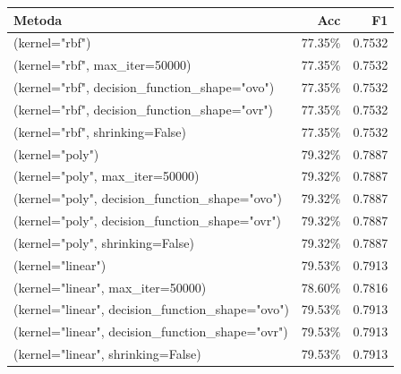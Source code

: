 \documentclass{acm_proc_article-sp}
\begin{document}
 \small
 \setlength{\tabcolsep}{3pt}
 \begin{tabular}{|lrr|}
\hline
Metoda & Acc & F1 \\
\hline \hline
(kernel="rbf") & 77.35\% & 0.7532 \\
\hline
(kernel="rbf", max\_iter=50000) & 77.35\% & 0.7532 \\
\hline
(kernel="rbf", decision\_function\_shape="ovo") & 77.35\% & 0.7532 \\
\hline
(kernel="rbf", decision\_function\_shape="ovr") & 77.35\% & 0.7532 \\
\hline
(kernel="rbf", shrinking=False) & 77.35\% & 0.7532 \\
\hline
(kernel="poly") & 79.32\% & 0.7887 \\
\hline
(kernel="poly", max\_iter=50000) & 79.32\% & 0.7887 \\
\hline
(kernel="poly", decision\_function\_shape="ovo") & 79.32\% & 0.7887 \\
\hline
(kernel="poly", decision\_function\_shape="ovr") & 79.32\% & 0.7887 \\
\hline
(kernel="poly", shrinking=False) & 79.32\% & 0.7887 \\
\hline
(kernel="linear") & 79.53\% & 0.7913 \\
\hline
(kernel="linear", max\_iter=50000) & 78.60\% & 0.7816 \\
\hline
(kernel="linear", decision\_function\_shape="ovo") & 79.53\% & 0.7913 \\
\hline
(kernel="linear", decision\_function\_shape="ovr") & 79.53\% & 0.7913 \\
\hline
(kernel="linear", shrinking=False) & 79.53\% & 0.7913 \\
\hline
\end{tabular}

\normalsize
\end{document}
